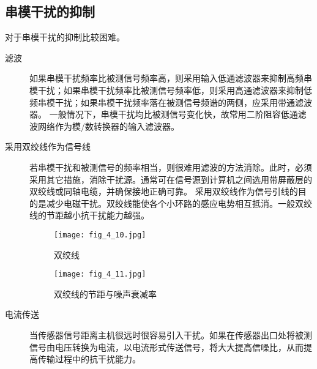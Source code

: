 \subsection{串模干扰的抑制}
对于串模干扰的抑制比较困难。
\begin{description}
  \item[滤波]
    如果串模干扰频率比被测信号频率高，则采用输入低通滤波器来抑制高频串模干扰；如果串模干扰频率比被测信号频率低，则采用高通滤波器来抑制低频串模干扰；如果串模干扰频率落在被测信号频谱的两侧，应采用带通滤波器。
   一般情况下，串模干扰均比被测信号变化快，故常用二阶阻容低通滤波网络作为模/数转换器的输入滤波器。
  \item[采用双绞线作为信号线]
    若串模干扰和被测信号的频率相当，则很难用滤波的方法消除。此时，必须采用其它措施，消除干扰源。通常可在信号源到计算机之间选用带屏蔽层的双绞线或同轴电缆，并确保接地正确可靠。
    采用双绞线作为信号引线的目的是减少电磁干扰。双绞线能使各个小环路的感应电势相互抵消。一般双绞线的节距越小抗干扰能力越强。

\begin{figure}[h]
  \centering
  \texttt{[image: fig\_4\_10.jpg]}\\
  \caption{双绞线}\label{fig_4_10}
\end{figure}

\begin{figure}[h]
  \centering
  \texttt{[image: fig\_4\_11.jpg]}\\
  \caption{双绞线的节距与噪声衰减率}\label{fig_4_11}
\end{figure}



  \item[电流传送]
    当传感器信号距离主机很远时很容易引入干扰。如果在传感器出口处将被测信号由电压转换为电流，以电流形式传送信号，将大大提高信噪比，从而提高传输过程中的抗干扰能力。
\end{description}



